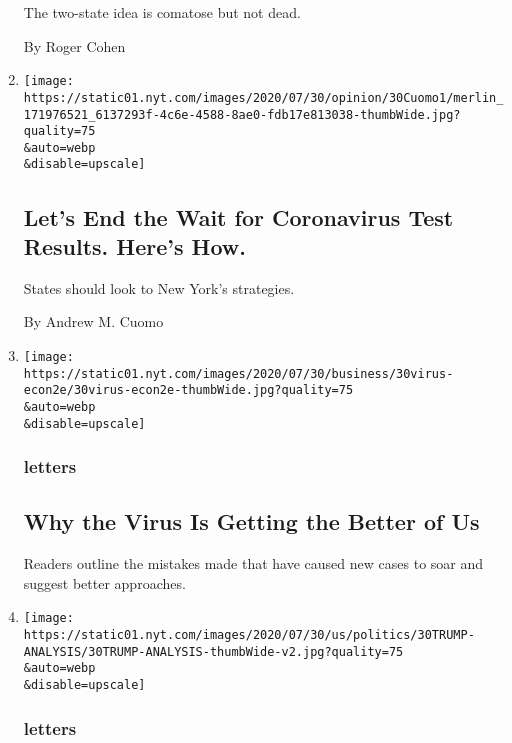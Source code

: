 \begin{enumerate}
  The two-state idea is comatose but not dead.

  By Roger Cohen
\item
  \href{/2020/07/31/opinion/coronavirus-testing-cuomo.html}{}

  \texttt{[image: https://static01.nyt.com/images/2020/07/30/opinion/30Cuomo1/merlin\_171976521\_6137293f-4c6e-4588-8ae0-fdb17e813038-thumbWide.jpg?quality=75\\\&auto=webp\\\&disable=upscale]}

  \hypertarget{lets-end-the-wait-for-coronavirus-test-results-heres-how}{%
  \subsection{Let's End the Wait for Coronavirus Test Results. Here's
  How.}\label{lets-end-the-wait-for-coronavirus-test-results-heres-how}}

  States should look to New York's strategies.

  By Andrew M. Cuomo
\item
  \href{/2020/07/31/opinion/letters/coronavirus-economy.html}{}

  \texttt{[image: https://static01.nyt.com/images/2020/07/30/business/30virus-econ2e/30virus-econ2e-thumbWide.jpg?quality=75\\\&auto=webp\\\&disable=upscale]}

  \hypertarget{letters-1}{%
  \subsubsection{letters}\label{letters-1}}

  \hypertarget{why-the-virus-is-getting-the-better-of-us}{%
  \subsection{Why the Virus Is Getting the Better of
  Us}\label{why-the-virus-is-getting-the-better-of-us}}

  Readers outline the mistakes made that have caused new cases to soar
  and suggest better approaches.
\item
  \href{/2020/07/31/opinion/letters/trump-election.html}{}

  \texttt{[image: https://static01.nyt.com/images/2020/07/30/us/politics/30TRUMP-ANALYSIS/30TRUMP-ANALYSIS-thumbWide-v2.jpg?quality=75\\\&auto=webp\\\&disable=upscale]}

  \hypertarget{letters-2}{%
  \subsubsection{letters}\label{letters-2}}


\end{enumerate}
